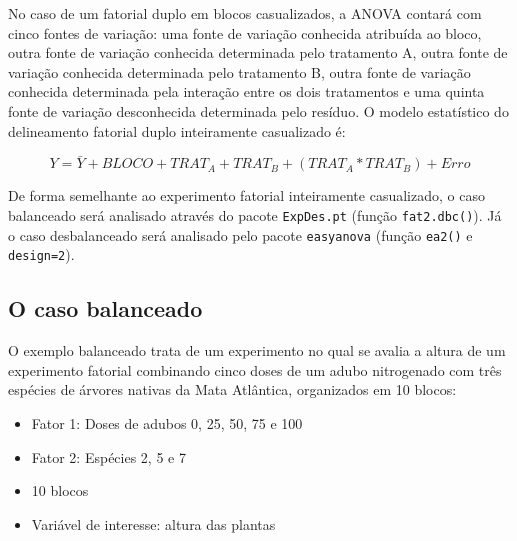 \documentclass[
]{article}
\providecommand{\tightlist}{%
  \setlength{\itemsep}{0pt}\setlength{\parskip}{0pt}}
\begin{document}
No caso de um fatorial duplo em blocos casualizados, a ANOVA contará com cinco fontes de variação: uma fonte de variação conhecida atribuída ao bloco, outra fonte de variação conhecida determinada pelo tratamento A, outra fonte de variação conhecida determinada pelo tratamento B, outra fonte de variação conhecida determinada pela interação entre os dois tratamentos e uma quinta fonte de variação desconhecida determinada pelo resíduo. O modelo estatístico do delineamento fatorial duplo inteiramente casualizado é:

\[Y = \bar{Y} + BLOCO + TRAT_A + TRAT_B + (TRAT_A * TRAT_B) + Erro\]

De forma semelhante ao experimento fatorial inteiramente casualizado, o caso balanceado será analisado através do pacote \texttt{ExpDes.pt} (função \texttt{fat2.dbc()}). Já o caso desbalanceado será analisado pelo pacote \texttt{easyanova} (função \texttt{ea2()} e \texttt{design=2}).

\hypertarget{o-caso-balanceado-3}{%
\subsection{O caso balanceado}\label{o-caso-balanceado-3}}

O exemplo balanceado trata de um experimento no qual se avalia a altura de um experimento fatorial combinando cinco doses de um adubo nitrogenado com três espécies de árvores nativas da Mata Atlântica, organizados em 10 blocos:

\begin{itemize}
\tightlist
\item
  Fator 1: Doses de adubos 0, 25, 50, 75 e 100
\item
  Fator 2: Espécies 2, 5 e 7
\item
  10 blocos
\item
  Variável de interesse: altura das plantas
\end{itemize}
\end{document}
